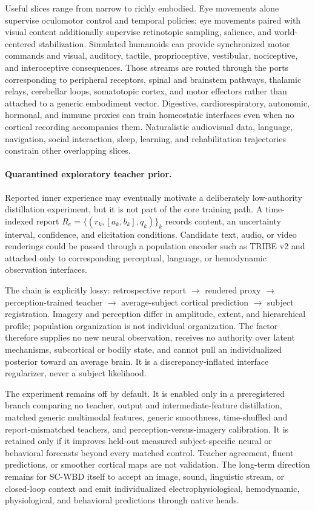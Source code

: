 Useful slices range from narrow to richly embodied. Eye movements alone
supervise oculomotor control and temporal policies; eye movements paired with
visual content additionally supervise retinotopic sampling, salience, and
world-centered stabilization. Simulated humanoids can provide synchronized
motor commands and visual, auditory, tactile, proprioceptive, vestibular,
nociceptive, and interoceptive consequences. Those streams are routed through
the ports corresponding to peripheral receptors, spinal and brainstem
pathways, thalamic relays, cerebellar loops, somatotopic cortex, and motor
effectors rather than attached to a generic embodiment vector. Digestive,
cardiorespiratory, autonomic, hormonal, and immune proxies can train
homeostatic interfaces even when no cortical recording accompanies them.
Naturalistic audiovisual data, language, navigation, social interaction,
sleep, learning, and rehabilitation trajectories constrain other overlapping
slices.

\paragraph{Quarantined exploratory teacher prior.}
Reported inner experience may eventually motivate a deliberately
low-authority distillation experiment, but it is not part of the core training
path. A time-indexed report
\(R_e=\{(r_k,[a_k,b_k],q_k)\}_k\) records content, an uncertainty interval,
confidence, and elicitation conditions. Candidate text, audio, or video
renderings could be passed through a population encoder such as TRIBE v2
\citep{dascoli2026tribe} and attached only to corresponding perceptual,
language, or hemodynamic observation interfaces.

The chain is explicitly lossy: retrospective report \(\rightarrow\) rendered
proxy \(\rightarrow\) perception-trained teacher \(\rightarrow\)
average-subject cortical prediction \(\rightarrow\) subject registration.
Imagery and perception differ in amplitude, extent, and hierarchical profile;
population organization is not individual organization. The factor therefore
supplies no new neural observation, receives no authority over latent
mechanisms, subcortical or bodily state, and cannot pull an individualized
posterior toward an average brain. It is a discrepancy-inflated interface
regularizer, never a subject likelihood.

The experiment remains off by default. It is enabled only in a preregistered
branch comparing no teacher, output and intermediate-feature distillation,
matched generic multimodal features, generic smoothness, time-shuffled and
report-mismatched teachers, and perception-versus-imagery calibration. It is
retained only if it improves held-out measured subject-specific neural or
behavioral forecasts beyond every matched control. Teacher agreement, fluent
predictions, or smoother cortical maps are not validation. The long-term
direction remains for SC-WBD itself to accept an image, sound, linguistic
stream, or closed-loop context and emit individualized electrophysiological,
hemodynamic, physiological, and behavioral predictions through native heads.

